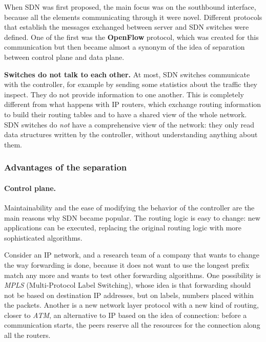 When SDN was first proposed, the main focus was on the southbound interface, because all the elements communicating through it were novel. Different protocols that establish the messages exchanged between server and SDN switches were defined. One of the first was the \textbf{OpenFlow} protocol, which was created for this communication but then became almost a synonym of the idea of separation between control plane and data plane.

\begin{notebox}
	\textbf{Switches do not talk to each other.} At most, SDN switches communicate with the controller, for example by sending some statistics about the traffic they inspect. They do not provide information to one another. This is completely different from what happens with IP routers, which exchange routing information to build their routing tables and to have a shared view of the whole network. SDN switches do \emph{not} have a comprehensive view of the network: they only read data structures written by the controller, without understanding anything about them.
\end{notebox}

\subsubsection*{Advantages of the separation}

\paragraph{Control plane.} Maintainability and the ease of modifying the behavior of the controller are the main reasons why SDN became popular. The routing logic is easy to change: new applications can be executed, replacing the original routing logic with more sophisticated algorithms.

Consider an IP network, and a research team of a company that wants to change the way forwarding is done, because it does not want to use the longest prefix match any more and wants to test other forwarding algorithms. One possibility is \emph{MPLS} (Multi-Protocol Label Switching), whose idea is that forwarding should not be based on destination IP addresses, but on labels, numbers placed within the packets. Another is a new network layer protocol with a new kind of routing, closer to \emph{ATM}, an alternative to IP based on the idea of connection: before a communication starts, the peers reserve all the resources for the connection along all the routers.

